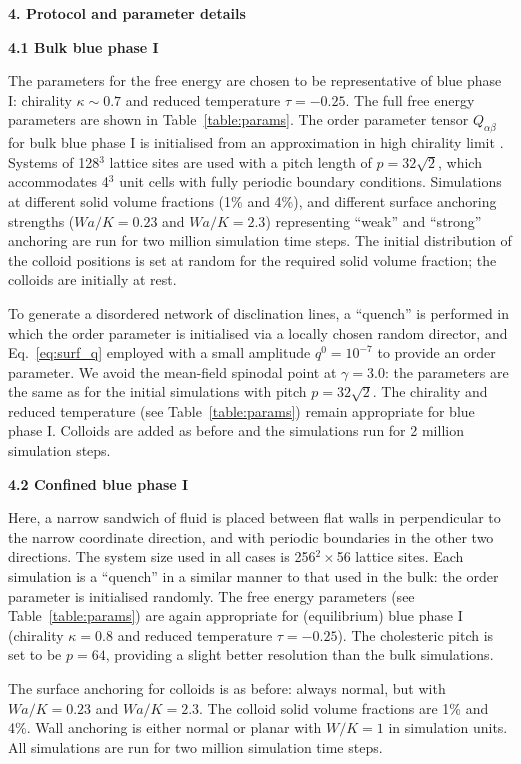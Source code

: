 \documentclass[12pt,twoside]{article}
\begin{document}
{\bf 4. Protocol and parameter details}

{\bf 4.1 Bulk blue phase I}

The parameters for the free energy are chosen to be representative
of blue phase I: chirality $\kappa \sim 0.7$ and reduced temperature
$\tau = -0.25$.
The full free energy parameters are shown in Table~\ref{table:params}.
The order parameter tensor $Q_{\alpha\beta}$ for bulk blue phase I is
initialised from an approximation in high chirality limit
\cite{blue1,oliver1}. Systems of 128$^3$ lattice sites are
used with a pitch length of $p = 32\sqrt{2}$, which accommodates 4$^3$
unit cells with fully periodic boundary conditions.
Simulations at different solid volume fractions (1\% and 4\%), and different 
surface anchoring strengths ($Wa/K = 0.23$ and $Wa/K = 2.3$) representing
``weak'' and ``strong'' anchoring are run for two million simulation
time steps.
The initial distribution of the colloid positions is set at random
for the required solid volume fraction; the colloids are initially
at rest.

To generate a disordered network of disclination lines, a ``quench''
is performed in which the order parameter is initialised via a
locally chosen random director, and
Eq.~\ref{eq:surf_q} employed with a small amplitude $q^0 = 10^{-7}$ to
provide an order parameter.
We avoid the mean-field spinodal point at $\gamma = 3.0$:
the parameters are the same as for the initial simulations with
pitch $p = 32\sqrt{2}$. The chirality and reduced temperature (see
Table~\ref{table:params}) remain appropriate for blue phase I.
Colloids are added as before and the simulations run for 2 million
simulation steps.

{\bf 4.2 Confined blue phase I}

Here, a narrow sandwich of fluid is placed between flat walls in
perpendicular to the narrow coordinate direction, and with periodic
boundaries in the other two directions. The system size used in all
cases is 256$^2 \times$56 lattice sites. Each simulation is a ``quench''
in a similar manner to that used in the bulk: the order parameter is
initialised randomly. The free energy parameters (see Table~\ref{table:params})
are again appropriate for (equilibrium) blue phase I
(chirality $\kappa = 0.8$ and
reduced temperature $\tau = -0.25$). The cholesteric pitch is set
to be $p = 64$, providing a slight better resolution than the bulk
simulations.

The surface anchoring for colloids is as before: always normal, but with
$Wa/K = 0.23$ and $Wa/K = 2.3$. The colloid solid volume fractions are
1\% and 4\%. Wall anchoring is either normal or planar with $W/K = 1$
in simulation units. All simulations are run for two million simulation
time steps.
\end{document}
